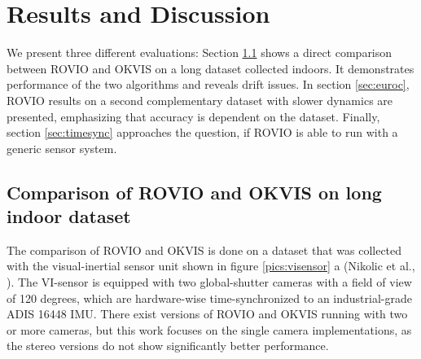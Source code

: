 \chapter{Results and Discussion}
\label{sec:results}

We present three different evaluations: Section \ref{sec:ijrr} shows a direct comparison between ROVIO and OKVIS on a long dataset collected indoors. It demonstrates performance of the two algorithms and reveals drift issues. In section \ref{sec:euroc}, ROVIO results on a second complementary dataset with slower dynamics are presented, emphasizing that accuracy is dependent on the dataset. Finally, section \ref{sec:timesync} approaches the question, if ROVIO is able to run with a generic sensor system.

\section{Comparison of ROVIO and OKVIS on long indoor dataset}
\label{sec:ijrr}

The comparison of ROVIO and OKVIS is done on a dataset that was collected with the visual-inertial sensor unit shown in figure \ref{pics:visensor} a (Nikolic et al., \cite{nikolic2014synchronized}). The VI-sensor is equipped with two global-shutter cameras with a field of view of 120 degrees, which are hardware-wise time-synchronized to an industrial-grade ADIS 16448 IMU. There exist versions of ROVIO and OKVIS running with two or more cameras, but this work focuses on the single camera implementations, as the stereo versions do not show significantly better performance.

